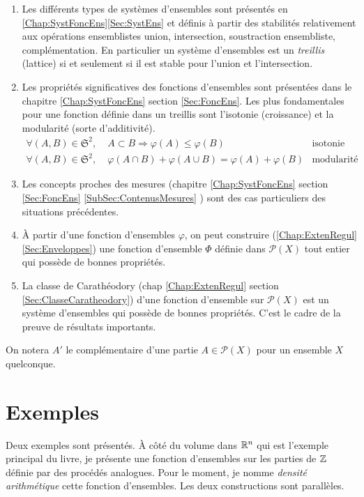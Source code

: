 \begin{enumerate}
 \item  Les différents types de systèmes d'ensembles sont présentés en \ref{Chap:SystFoncEns}\ref{Sec:SystEns} et définis à partir des stabilités relativement aux opérations ensemblistes union, intersection, soustraction ensembliste, complémentation.\newline
 En particulier un système d'ensembles est un \emph{treillis} (lattice) si et seulement si il est stable pour l'union et l'intersection.
 \item Les propriétés significatives des fonctions d'ensembles sont présentées dans le chapitre \ref{Chap:SystFoncEns} section \ref{Sec:FoncEns}. Les plus fondamentales pour une fonction définie dans un treillis sont l'isotonie (croissance) et la modularité (sorte d'additivité).
 \begin{displaymath}
   \begin{aligned}
     \forall (A,B) \in \mathfrak{S}^2, \;& A \subset B \Rightarrow \varphi(A) \leq \varphi(B) &\text{isotonie}& \\
     \forall (A,B) \in \mathfrak{S}^2, \;&  \varphi(A\cap B) + \varphi(A \cup B) = \varphi(A) + \varphi(B) &\text{modularité}&
   \end{aligned}
 \end{displaymath}

 \item Les concepts proches des mesures (chapitre \ref{Chap:SystFoncEns} section \ref{Sec:FoncEns} \ref{SubSec:ContenusMesures} ) sont des cas particuliers des situations précédentes.
 \item À partir d'une fonction d'ensembles $\varphi$, on peut construire (\ref{Chap:ExtenRegul} \ref{Sec:Enveloppes}) une fonction d'ensemble $\Phi$ définie dans $\mathcal{P}(X)$ tout entier qui possède de bonnes propriétés.
 \item La classe de Carathéodory (chap \ref{Chap:ExtenRegul} section \ref{Sec:ClasseCaratheodory}) d'une fonction d'ensemble sur $\mathcal{P}(X)$ est un système d'ensembles qui possède de bonnes propriétés. C'est le cadre de la preuve de résultats importants.
\end{enumerate}

On notera $A'$ le complémentaire d'une partie $A \in \mathcal{P}(X)$ pour un ensemble $X$ quelconque.
\newpage

\chapter{Exemples}\label{Chap:Exples}
Deux exemples sont présentés. À côté du volume dans $\mathbb{R}^n$ qui est l'exemple principal du livre, je présente une fonction d'ensembles sur les parties de $\mathbb{Z}$ définie par des procédés analogues. Pour le moment, je nomme \emph{densité arithmétique} cette fonction d'ensembles. Les deux constructions sont parallèles.

